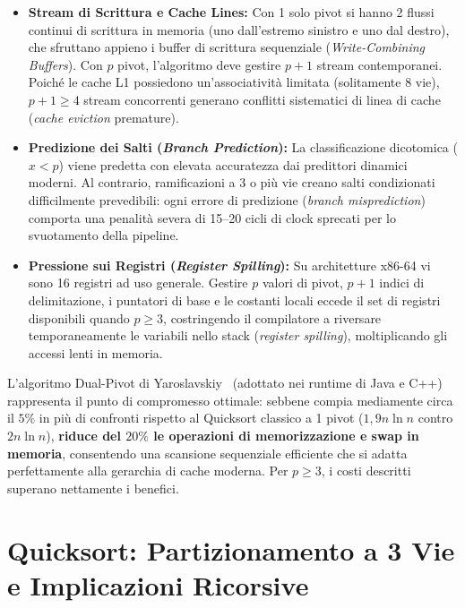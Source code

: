 \begin{itemize}
  \item \textbf{Stream di Scrittura e Cache Lines:} Con 1 solo pivot si hanno 2 flussi continui di scrittura in memoria (uno dall'estremo sinistro e uno dal destro), che sfruttano appieno i buffer di scrittura sequenziale (\textit{Write-Combining Buffers}). Con $p$ pivot, l'algoritmo deve gestire $p+1$ stream contemporanei. Poiché le cache L1 possiedono un'associatività limitata (solitamente 8 vie), $p+1 \ge 4$ stream concorrenti generano conflitti sistematici di linea di cache (\textit{cache eviction} premature).
  \item \textbf{Predizione dei Salti (\textit{Branch Prediction}):} La classificazione dicotomica ($x < p$) viene predetta con elevata accuratezza dai predittori dinamici moderni. Al contrario, ramificazioni a 3 o più vie creano salti condizionati difficilmente prevedibili: ogni errore di predizione (\textit{branch misprediction}) comporta una penalità severa di 15--20 cicli di clock sprecati per lo svuotamento della pipeline.
  \item \textbf{Pressione sui Registri (\textit{Register Spilling}):} Su architetture x86-64 vi sono 16 registri ad uso generale. Gestire $p$ valori di pivot, $p+1$ indici di delimitazione, i puntatori di base e le costanti locali eccede il set di registri disponibili quando $p \ge 3$, costringendo il compilatore a riversare temporaneamente le variabili nello stack (\textit{register spilling}), moltiplicando gli accessi lenti in memoria.
\end{itemize}

\begin{property}[Perché il Dual-Pivot ($p=2$) Funziona nella Pratica?]
L'algoritmo Dual-Pivot di Yaroslavskiy~\cite{yaroslavskiy2009} (adottato nei runtime di Java e C++) rappresenta il punto di compromesso ottimale: sebbene compia mediamente circa il $5\%$ in più di confronti rispetto al Quicksort classico a 1 pivot ($1{,}9 n \ln n$ contro $2 n \ln n$), \textbf{riduce del $20\%$ le operazioni di memorizzazione e swap in memoria}, consentendo una scansione sequenziale efficiente che si adatta perfettamente alla gerarchia di cache moderna. Per $p \ge 3$, i costi descritti superano nettamente i benefici.
\end{property}

\FloatBarrier
\section{Quicksort: Partizionamento a 3 Vie e Implicazioni Ricorsive}
\label{sec:3way-partitioning}

